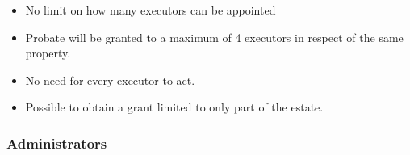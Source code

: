 \documentclass[
]{article}
\providecommand{\tightlist}{%
  \setlength{\itemsep}{0pt}\setlength{\parskip}{0pt}}
\begin{document}
\begin{itemize}
  \begin{itemize}
  \tightlist
  \item
    No limit on how many executors can be appointed
  \item
    Probate will be granted to a maximum of 4 executors in respect of
    the same property.
  \item
    No need for every executor to act.
  \item
    Possible to obtain a grant limited to only part of the estate.
  \end{itemize}
\end{itemize}

\hypertarget{administrators}{%
\subsubsection{Administrators}\label{administrators}}
\end{document}
